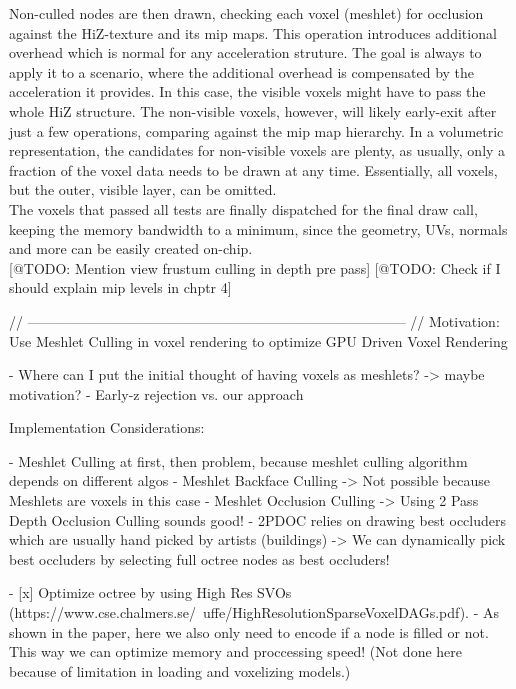 \noindent
Non-culled nodes are then drawn, checking each voxel (meshlet) for occlusion against the \ac{HiZ}-texture and its mip maps. 
This operation introduces additional overhead which is normal for any acceleration struture. The goal is always to apply it 
to a scenario, where the additional overhead is compensated by the acceleration it provides. In this case, the visible voxels 
might have to pass the whole \ac{HiZ} structure. The non-visible voxels, however, will likely early-exit after just a few 
operations, comparing against the mip map hierarchy. In a volumetric representation, the candidates for non-visible voxels 
are plenty, as usually, only a fraction of the voxel data needs to be drawn at any time. Essentially, all voxels, but the 
outer, visible layer, can be omitted.\\

\noindent
The voxels that passed all tests are finally dispatched for the final draw call, keeping the memory bandwidth to a minimum, 
since the geometry, UVs, normals and more can be easily created on-chip. \\




[@TODO: Mention view frustum culling in depth pre pass]
[@TODO: Check if I should explain mip levels in chptr 4]


// --------------------------------------------------------------------------------- //
Motivation:
Use Meshlet Culling in voxel rendering to optimize GPU Driven Voxel Rendering

- Where can I put the initial thought of having voxels as meshlets? -> maybe motivation? 
- Early-z rejection vs. our approach

Implementation Considerations:

- Meshlet Culling at first, then problem, because meshlet culling algorithm depends on different algos
    - Meshlet Backface Culling -> Not possible because Meshlets are voxels in this case
    - Meshlet Occlusion Culling -> Using 2 Pass Depth Occlusion Culling sounds good!
    - 2PDOC relies on drawing best occluders which are usually hand picked by artists (buildings)
        -> We can dynamically pick best occluders by selecting full octree nodes as best occluders!

- [x] Optimize octree by using High Res SVOs (https://www.cse.chalmers.se/~uffe/HighResolutionSparseVoxelDAGs.pdf).
    - As shown in the paper, here we also only need to encode if a node is filled or not. This way we can 
    optimize memory and proccessing speed! (Not done here because of limitation in loading and voxelizing models.)

